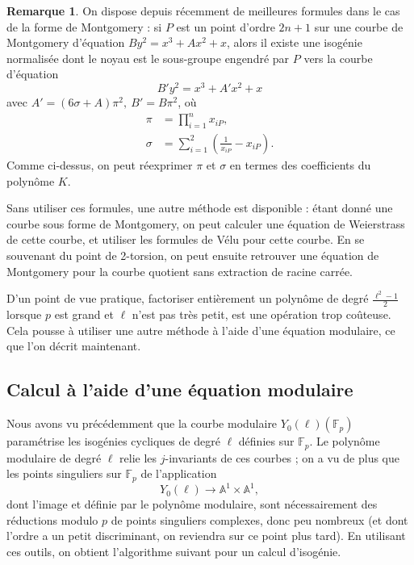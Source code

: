 \documentclass[11pt,a4paper]{article}
\newcommand{\A}{\mathbb{A}}
\newcommand{\F}{\mathbb{F}}
\newcommand{\vers}{\longrightarrow}
\theoremstyle{definition}
\newtheorem*{rem}{Remarque}
\begin{document}
\begin{rem}
On dispose depuis récemment de meilleures formules dans le cas de la forme de Montgomery : si $P$ est un point d'ordre $2n+1$ sur une courbe de Montgomery d'équation $By^2 = x^3 + Ax^2 + x$, alors il existe une isogénie normalisée dont le noyau est le sous-groupe engendré par $P$ vers la courbe d'équation
$$B'y^2 = x^3 + A'x^2 + x$$
avec $A' = (6\sigma + A)\pi^2,\ B' = B\pi^2$, où
$$\begin{aligned}
\pi &= \prod_{i = 1}^n x_{iP}, \\
\sigma &= \sum_{i = 1}^2 \left(\frac{1}{x_{iP}} - x_{iP}\right).
\end{aligned}$$
Comme ci-dessus, on peut réexprimer $\pi$ et $\sigma$ en termes des coefficients du polynôme $K$.

Sans utiliser ces formules, une autre méthode est disponible : étant donné une courbe sous forme de Montgomery, on peut calculer une équation de Weierstrass de cette courbe, et utiliser les formules de Vélu pour cette courbe. En se souvenant du point de 2-torsion, on peut ensuite retrouver une équation de Montgomery pour la courbe quotient sans extraction de racine carrée.
\end{rem}

D'un point de vue pratique, factoriser entièrement un polynôme de degré $\frac{\ell^2 - 1}{2}$ lorsque $p$ est grand et $\ell$ n'est pas très petit, est une opération trop coûteuse. Cela pousse à utiliser une autre méthode à l'aide d'une équation modulaire, ce que l'on décrit maintenant.


\subsection{Calcul à l'aide d'une équation modulaire}

Nous avons vu précédemment que la courbe modulaire $Y_0(\ell)(\F_p)$ paramétrise les isogénies cycliques de degré $\ell$ définies sur $\F_p$. Le polynôme modulaire de degré $\ell$ relie les $j$-invariants de ces courbes ; on a vu de plus que les points singuliers sur $\F_p$ de l'application
$$Y_0(\ell) \vers \A^1 \times \A^1,$$
dont l'image et définie par le polynôme modulaire, sont nécessairement des réductions modulo $p$ de points singuliers complexes, donc peu nombreux (et dont l'ordre a un petit discriminant, on reviendra sur ce point plus tard). En utilisant ces outils, on obtient l'algorithme suivant pour un calcul d'isogénie.
\end{document}
